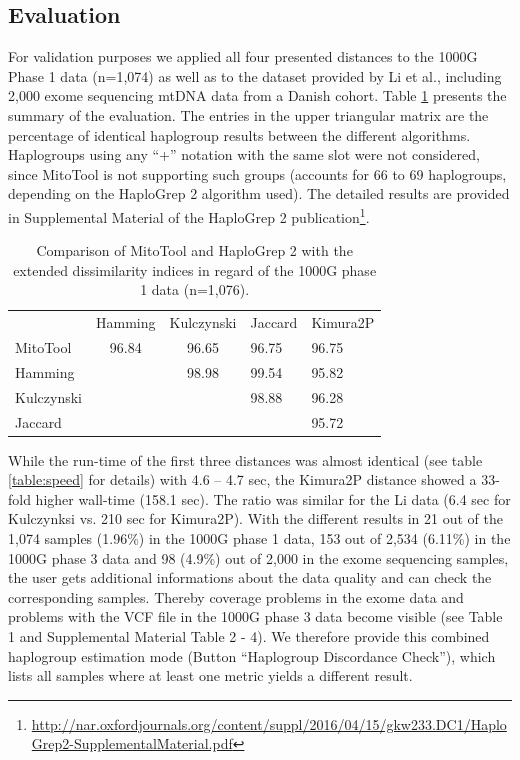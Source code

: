 \subsection{Evaluation}
\label{subs:evaluation}

For validation purposes we applied all four presented distances to the 1000G Phase 1 data (n=1,074) as well as to the dataset provided by Li et al.\cite{Li2014}, including 2,000 exome sequencing mtDNA data from a Danish cohort. Table \ref{table:distances} presents the summary of the evaluation. The entries in the upper triangular matrix are the percentage of identical haplogroup results between the different algorithms. Haplogroups using any “+” notation with the same slot were not considered, since MitoTool is not supporting such groups (accounts for 66 to 69 haplogroups, depending on the HaploGrep 2 algorithm used). The detailed results are provided in Supplemental Material of the HaploGrep 2 publication\footnote{\url{http://nar.oxfordjournals.org/content/suppl/2016/04/15/gkw233.DC1/HaploGrep2-SupplementalMaterial.pdf}}. 
\begin{table}[H]
\centering
\label{table:distances}
\begin{tabular}{lllll}
\cellcolor[HTML]{FFFFFF} & \cellcolor[HTML]{FFFFFF}Hamming & \cellcolor[HTML]{FFFFFF}Kulczynski & Jaccard & Kimura2P \\
MitoTool & \multicolumn{1}{c}{\cellcolor[HTML]{96FFFB}96.84} & \multicolumn{1}{c}{\cellcolor[HTML]{96FFFB}96.65} & \cellcolor[HTML]{96FFFB}96.75 & \cellcolor[HTML]{96FFFB}96.75 \\
Hamming & \multicolumn{1}{c}{\cellcolor[HTML]{FFFFFF}{\color[HTML]{330001} }} & \multicolumn{1}{c}{\cellcolor[HTML]{A9D0FF}98.98} & \cellcolor[HTML]{34CDF9}99.54 & \cellcolor[HTML]{ECF4FF}95.82 \\
Kulczynski & & \cellcolor[HTML]{FFFFFF} & \cellcolor[HTML]{A9D0FF}98.88 & \cellcolor[HTML]{96FFFB}96.28 \\
Jaccard & & & & \cellcolor[HTML]{ECF4FF}95.72 \\
\end{tabular}
\caption{Comparison of MitoTool and HaploGrep 2 with the extended dissimilarity indices in regard of the 1000G phase 1 data (n=1,076).}
\end{table}
While the run-time of the first three distances was almost identical (see table \ref{table:speed} for details) with 4.6 – 4.7 sec, the Kimura2P distance showed a 33-fold higher wall-time (158.1 sec). The ratio was similar for the Li data
(6.4 sec for Kulczynksi vs. 210 sec for Kimura2P). With the different results in 21 out of the 1,074
samples (1.96\%) in the 1000G phase 1 data, 153 out of 2,534 (6.11\%) in the 1000G phase 3 data
and 98 (4.9\%) out of 2,000 in the exome sequencing samples, the user gets additional informations
about the data quality and can check the corresponding samples. Thereby coverage problems in the
exome data and problems with the VCF file in the 1000G phase 3 data become visible (see Table 1
and Supplemental Material Table 2 - 4). We therefore provide this combined haplogroup estimation
mode (Button “Haplogroup Discordance Check”), which lists all samples where at least one metric
yields a different result.

